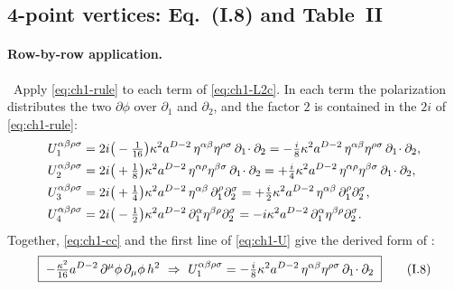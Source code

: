 \subsection{4-point vertices: Eq.~(I.8) and Table~II}
\label{sec:ch1-t2-4pt}

\paragraph{Row-by-row application.} \tD\ Apply \eqref{eq:ch1-rule} to each
term of \eqref{eq:ch1-L2c}. In each term the polarization distributes the two
$\partial\phi$ over $\partial_1$ and $\partial_2$, and the factor $2$ is contained
in the $2i$ of \eqref{eq:ch1-rule}:
\begin{equation}
\begin{aligned}
U_1^{\alpha\beta\rho\sigma}&=2i\big(-\tfrac1{16}\big)\kappa^2a^{D-2}\,\eta^{\alpha\beta}\eta^{\rho\sigma}\,\partial_1\!\cdot\partial_2=-\tfrac i8\kappa^2a^{D-2}\,\eta^{\alpha\beta}\eta^{\rho\sigma}\,\partial_1\!\cdot\partial_2,\\
U_2^{\alpha\beta\rho\sigma}&=2i\big(+\tfrac18\big)\kappa^2a^{D-2}\,\eta^{\alpha\rho}\eta^{\beta\sigma}\,\partial_1\!\cdot\partial_2=+\tfrac i4\kappa^2a^{D-2}\,\eta^{\alpha\rho}\eta^{\beta\sigma}\,\partial_1\!\cdot\partial_2,\\
U_3^{\alpha\beta\rho\sigma}&=2i\big(+\tfrac14\big)\kappa^2a^{D-2}\,\eta^{\alpha\beta}\,\partial_1^\rho\partial_2^\sigma=+\tfrac i2\kappa^2a^{D-2}\,\eta^{\alpha\beta}\,\partial_1^\rho\partial_2^\sigma,\\
U_4^{\alpha\beta\rho\sigma}&=2i\big(-\tfrac12\big)\kappa^2a^{D-2}\,\partial_1^\alpha\eta^{\beta\rho}\partial_2^\sigma=-i\kappa^2a^{D-2}\,\partial_1^\alpha\eta^{\beta\rho}\partial_2^\sigma .
\end{aligned}
\label{eq:ch1-U}
\end{equation}
Together, \eqref{eq:ch1-cc} and the first line of \eqref{eq:ch1-U} give the
derived form of :
\begin{equation*}
\boxed{\;-\tfrac{\kappa^2}{16}a^{D-2}\,\partial^\mu\phi\,\partial_\mu\phi\,h^2\ \Rightarrow\ U_1^{\alpha\beta\rho\sigma}=-\tfrac i8\kappa^2a^{D-2}\,\eta^{\alpha\beta}\eta^{\rho\sigma}\,\chAdd\;}
\tag{I.8}\label{eq:ch1-eq8}
\end{equation*}


